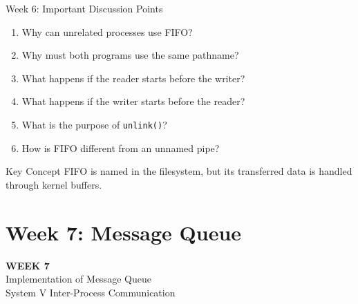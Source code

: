 \documentclass[aspectratio=169,10pt]{beamer}
\begin{document}
\begin{frame}{Week 6: Important Discussion Points}

\begin{enumerate}
    \item Why can unrelated processes use FIFO?
    \item Why must both programs use the same pathname?
    \item What happens if the reader starts before the writer?
    \item What happens if the writer starts before the reader?
    \item What is the purpose of \texttt{unlink()}?
    \item How is FIFO different from an unnamed pipe?
\end{enumerate}

\begin{alertblock}{Key Concept}
FIFO is named in the filesystem, but its
transferred data is handled through kernel buffers.
\end{alertblock}

\end{frame}

\section{Week 7: Message Queue}

\begin{frame}
\centering
\vfill
{\Huge\bfseries WEEK 7}\\[0.5cm]
{\LARGE Implementation of Message Queue}\\[0.4cm]
{\large System V Inter-Process Communication}
\vfill
\end{frame}
\end{document}
